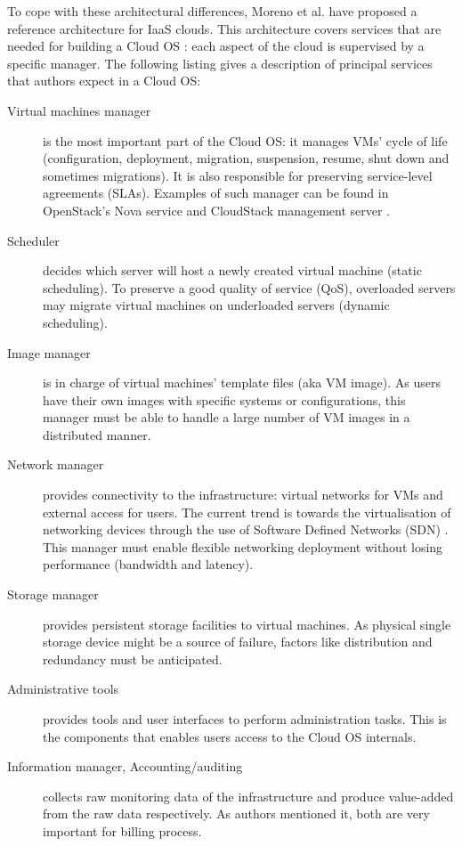 To cope with these architectural differences, Moreno et al. have proposed a 
reference architecture \cite{moreno2012iaas} for IaaS clouds. This architecture 
covers services that are needed for building a Cloud OS : each aspect of the 
cloud is supervised by a specific manager. The following listing gives a 
description of principal services that authors expect in a Cloud OS:
\begin{description}
	
	\item [Virtual machines manager] is the most important part of the Cloud OS:
	it manages VMs' cycle of life (configuration, deployment, 
	migration, suspension, resume, shut down and sometimes migrations). It is 
	also responsible for preserving service-level agreements (SLAs). Examples of
	such manager can be found in OpenStack's Nova \cite{OPENSTACK:2014:nova} 
	service and CloudStack management server \cite{CLOUDSTACK:2014:management}.

	\item [Scheduler] decides which server will host a newly created virtual 
	machine (static scheduling). To preserve a good quality of service (QoS), 
	overloaded servers may migrate virtual machines on underloaded servers 
	(dynamic scheduling).

	\item [Image manager] is in charge of virtual machines' template files (aka 
	VM image). As users have their own images with specific systems or 
	configurations, this manager must be able to handle a large number of VM
	images in a distributed manner.

	\item [Network manager] provides connectivity to the infrastructure: virtual
	networks for VMs and external access for users. The current trend is towards 
	the	virtualisation of networking devices through the use of Software Defined
	Networks (SDN) \cite{onf2012software}. This manager must enable flexible 
	networking deployment without losing performance (bandwidth and latency).

	\item [Storage manager] provides persistent storage facilities to virtual 
	machines. As physical single storage device might be a source of failure,
	factors like distribution and redundancy must be anticipated.

	\item [Administrative tools] provides tools and user interfaces to perform
	administration tasks. This is the components that enables users access to
	the Cloud OS internals.

	\item [Information manager, Accounting/auditing ] collects raw monitoring 
	data of the infrastructure and produce value-added from the raw data 
	respectively. As authors mentioned it, both are very important for billing
	process.

\end{description}

